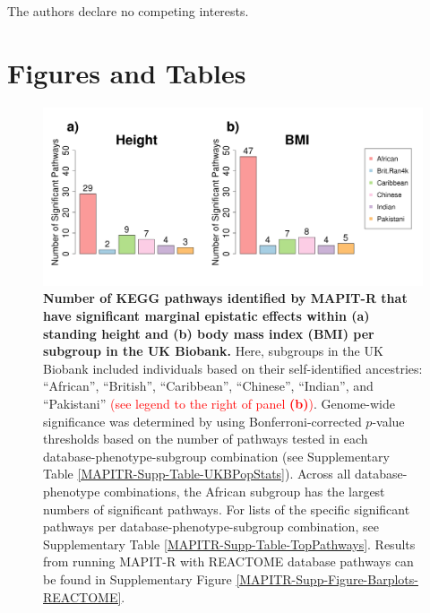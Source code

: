 \documentclass[10pt]{article}
\begin{document}
The authors declare no competing interests.


\clearpage
\newpage

\section*{Figures and Tables}

\begin{figure}[htb]
\centering
\includegraphics[width=\textwidth]{Images/Main/Figure1.png}
\caption{\textbf{Number of KEGG pathways identified by MAPIT-R that have significant marginal epistatic effects within (a) standing height and (b) body mass index (BMI) per subgroup in the UK Biobank.} Here, subgroups in the UK Biobank included individuals based on their self-identified ancestries: ``African'', ``British'', ``Caribbean'', ``Chinese'', ``Indian'', and ``Pakistani'' \textcolor{red}{(see legend to the right of panel \textbf{(b)})}. Genome-wide significance was determined by using Bonferroni-corrected $p$-value thresholds based on the number of pathways tested in each database-phenotype-subgroup combination (see Supplementary Table \ref{MAPITR-Supp-Table-UKBPopStats}). Across all database-phenotype combinations, the African subgroup has the largest numbers of significant pathways. For lists of the specific significant pathways per database-phenotype-subgroup combination, see Supplementary Table \ref{MAPITR-Supp-Table-TopPathways}. Results from running MAPIT-R with REACTOME database pathways can be found in Supplementary Figure \ref{MAPITR-Supp-Figure-Barplots-REACTOME}.}
\label{MAPITR-Main-Figure-Barplots-KEGG}
\end{figure}

\end{document}
